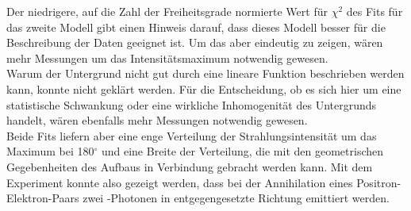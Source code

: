 Der niedrigere, auf die Zahl der Freiheitsgrade normierte Wert für $\chi^2$ des Fits für das zweite Modell
gibt einen Hinweis darauf, dass dieses Modell besser für die Beschreibung der Daten geeignet ist.
Um das aber eindeutig zu zeigen, wären mehr Messungen um das Intensitätsmaximum notwendig gewesen.\\
Warum der Untergrund nicht gut durch eine lineare Funktion beschrieben werden kann,
konnte nicht geklärt werden.
Für die Entscheidung, ob es sich hier um eine statistische Schwankung oder eine wirkliche
Inhomogenität des Untergrunds handelt, wären ebenfalls mehr Messungen notwendig gewesen.\\
Beide Fits liefern aber eine enge Verteilung der Strahlungsintensität um das Maximum bei 180$^\circ$
und eine Breite der Verteilung, die mit den geometrischen Gegebenheiten des Aufbaus in Verbindung gebracht
werden kann.
Mit dem Experiment konnte also gezeigt werden, dass bei der Annihilation eines Positron-Elektron-Paars
zwei \textgamma-Photonen in entgegengesetzte Richtung emittiert werden.



